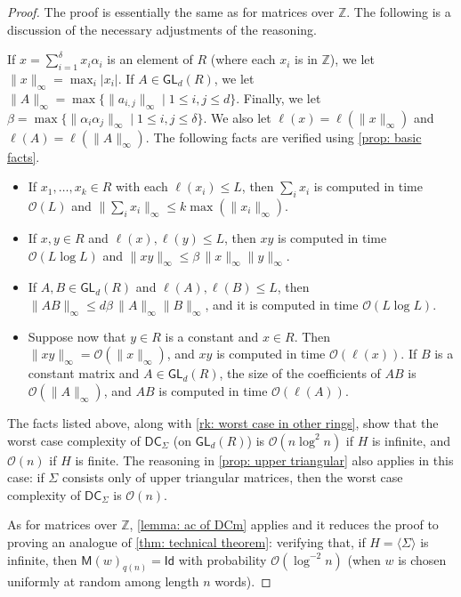 \documentclass[10pt,a4paper]{amsart}
\def\DC{\textsf{DC}}
\def\GL{\textsf{GL}}
\def\Id{\textsf{Id}}
\def\O{\mathcal{O}}
\def\Z{\mathbb{Z}}
\def\mat{\textsf{M}}
\begin{document}
\begin{proof}
%
The proof is essentially the same as for matrices over $\Z$. The following is a discussion of the necessary adjustments of the reasoning.

If $x = \sum_{i=1}^\delta x_i\alpha_i$ is an element of $R$ (where each $x_i$ is in $\Z$), we let $\|x\|_\infty = \max_i|x_i|$. If $A\in \GL_d(R)$, we let $\|A\|_\infty = \max\{\|a_{i,j}\|_\infty \mid 1\le i,j\le d\}$. Finally, we let $\beta = \max\{\|\alpha_i\alpha_j\|_\infty \mid 1\le i,j \le \delta\}$. We also let $\ell(x) = \ell(\|x\|_\infty)$ and $\ell(A) = \ell(\|A\|_\infty)$.
%
The following facts are verified using \cref{prop: basic facts}.
%
\begin{itemize}
    \item If $x_1,\dots, x_k \in R$ with each $\ell(x_i) \le L$, then $\sum_i x_i$ is computed in time $\O(L)$ and $\|\sum_ix_i\|_\infty \le k \max(\|x_i\|_\infty)$.

    \item If $x, y \in R$ and $\ell(x), \ell(y) \le L$, then $xy$ is computed in time $\O(L\log L)$ and $\|xy\|_\infty \le \beta\, \|x\|_\infty \|y\|_\infty$.

    \item If $A, B \in \GL_d(R)$ and $\ell(A), \ell(B) \le L$, then $\|AB\|_\infty \le d\beta\, \|A\|_\infty \|B\|_\infty$, and it is computed in time $\O(L\log L)$.

    \item Suppose now that $y \in R$ is a constant and $x\in R$. Then $\|xy\|_\infty = \O(\|x\|_\infty)$, and $xy$ is computed in time $\O(\ell(x))$. If $B$ is a constant matrix and $A \in \GL_d(R)$, the size of the coefficients of $AB$ is $\O(\|A\|_\infty)$, and $AB$ is computed in time $\O(\ell(A))$.
%
\end{itemize}

The facts listed above, along with \cref{rk: worst case in other rings}, show that the worst case complexity of $\DC_\Sigma$ (on $\GL_d(R)$) is $\O(n\log^2n)$ if $H$ is infinite, and $\O(n)$ if $H$ is finite. The reasoning in \cref{prop: upper triangular} also applies in this case: if $\Sigma$ consists only of upper triangular matrices, then the worst case complexity of $\DC_\Sigma$ is $\O(n)$.

As for matrices over $\Z$, \cref{lemma: ac of DCm} applies and it reduces the proof to proving an analogue of \cref{thm: technical theorem}: verifying that, if $H = \langle\Sigma\rangle$ is infinite, then $\mat(w)_{q(n)} = \Id$ with probability $\O(\log^{-2} n)$ (when $w$ is chosen uniformly at random among length $n$ words).


\end{proof}
\end{document}

